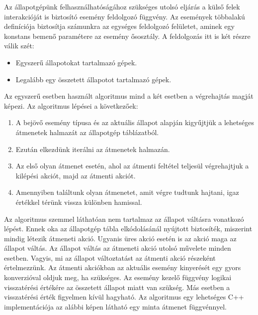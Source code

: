 \documentclass[a4paper,12pt]{report}
\begin{document}
Az állapotgépünk felhasználhatóságához szükséges utolsó eljárás a külső felek interakcióját is biztosító esemény feldolgozó függvény. Az események többalakú definíciója biztosítja számunkra az egységes feldolgozó felületet, aminek egy konstans bemenő paramétere az esemény ősosztály. A feldolgozás itt is két részre válik szét:
\begin{itemize}
\item Egyszerű állapotokat tartalmazó gépek.
\item Legalább egy összetett állapotot tartalmazó gépek.
\end{itemize}
Az egyszerű esetben használt algoritmus mind a két esetben a végrehajtás magját képezi. Az algoritmus lépései a következőek:
\begin{enumerate}
\item A bejövő esemény típusa és az aktuális állapot alapján kigyűjtjük a lehetséges átmenetek halmazát az állapotgép táblázatból.
\item Ezután elkezdünk iterálni az átmenetek halmazán.
\item Az első olyan átmenet esetén, ahol az átmenti feltétel teljesül végrehajtjuk a kilépési akciót, majd az átmenti akciót.
\item Amennyiben találtunk olyan átmenetet, amit végre tudtunk hajtani, igaz értékkel térünk vissza különben hamissal.
\end{enumerate}
Az algoritmus szemmel láthatóan nem tartalmaz az állapot váltásra vonatkozó lépést. Ennek oka az állapotgép tábla elkódolásánál nyújtott biztosíték, miszerint mindig létezik átmeneti akció. Ugyanis üres akció esetén is az akció maga az állapot váltás. Az állapot váltás az átmeneti akció utolsó művelete minden esetben. Vagyis, mi az állapot változtatást az átmenti akció részeként értelmezzünk. Az átmenti akciókban az aktuális esemény kinyerését egy gyors konverzióval oldjuk meg, ha szükséges. Az esemény kezelő függvény logikai visszatérési értékére az összetett állapot miatt van szükség. Más esetben a visszatérési érték figyelmen kívül hagyható. Az algoritmus egy lehetséges C++ implementációja az alábbi képen látható egy minta átmenet függvénnyel.
\end{document}
